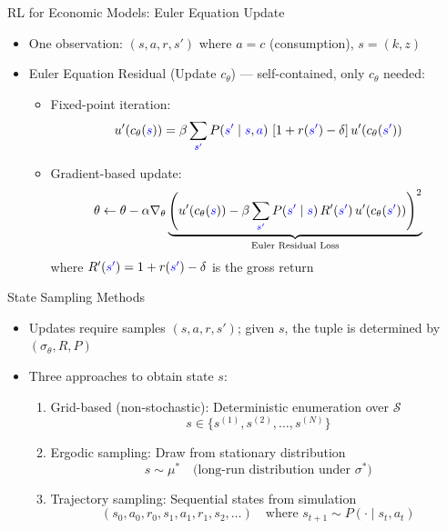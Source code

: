 \documentclass[aspectratio=169]{beamer}
\newcommand{\1}{\mathbf{1}}
\begin{document}
\begin{frame}{RL for Economic Models: Euler Equation Update}
  \begin{itemize}
      \item One observation: $(s, a, r, s')$ where $a = c$ (consumption), $s = (k, z)$
      \item Euler Equation Residual (Update $c_\theta$) --- self-contained, only $c_\theta$ needed:
        \begin{itemize}
          \item Fixed-point iteration:
          $$u'(c_\theta(\textcolor{blue}{s})) = \beta \sum_{\textcolor{blue}{s'}} P(\textcolor{blue}{s'} \mid \textcolor{blue}{s}, \textcolor{blue}{a})\, \left[ 1 + r(\textcolor{blue}{s'}) - \delta \right] u'(c_\theta(\textcolor{blue}{s'}))$$
          \item Gradient-based update:
          \begin{align*}
            \theta \leftarrow \theta - \alpha \nabla_\theta \underbrace{\left( u'(c_\theta(\textcolor{blue}{s})) - \beta \sum_{\textcolor{blue}{s'}} P(\textcolor{blue}{s'} \mid \textcolor{blue}{s})\, R'(\textcolor{blue}{s'})\, u'(c_\theta(\textcolor{blue}{s'})) \right)^2}_{\text{Euler Residual Loss}}
          \end{align*}
          where $R'(\textcolor{blue}{s'}) = 1 + r(\textcolor{blue}{s'}) - \delta$ is the gross return
        \end{itemize}
  \end{itemize}
\end{frame}

\begin{frame}{State Sampling Methods}
  \begin{itemize}
      \item Updates require samples $(s, a, r, s')$; given $s$, the tuple is determined by $(\sigma_\theta, R, P)$
      \item Three approaches to obtain state $s$:
      \begin{enumerate}
          \item Grid-based (non-stochastic): Deterministic enumeration over $\mathcal{S}$
          \[
          s \in \{s^{(1)}, s^{(2)}, \ldots, s^{(N)}\}
          \]
          \item Ergodic sampling: Draw from stationary distribution
          \[
          s \sim \mu^* \quad \text{(long-run distribution under } \sigma^*)
          \]
          \item Trajectory sampling: Sequential states from simulation
          \[
          (s_0, a_0, r_0, s_1, a_1, r_1, s_2, \ldots) \quad \text{where } s_{t+1} \sim P(\cdot \mid s_t, a_t)
          \]
      \end{enumerate}
  \end{itemize}
\end{frame}
\end{document}
